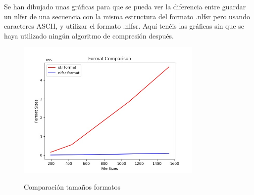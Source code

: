Se han dibujado unas gráficas para que se pueda ver la diferencia entre guardar un nlfsr de una secuencia con la misma estructura del formato .nlfsr pero usando caracteres ASCII, y utilizar el formato .nlfsr. Aquí tenéis las gráficas sin que se haya utilizado ningún algoritmo de compresión después. 
\begin{figure}[h] %
    \centering
    \includegraphics[width=0.8\textwidth,keepaspectratio]{img/format_comparison_graph.jpeg}
    \parbox{\linewidth}{\centering Comparación tamaños formatos}
    \label{fig:mi_imagen} 
\end{figure}
\newpage
